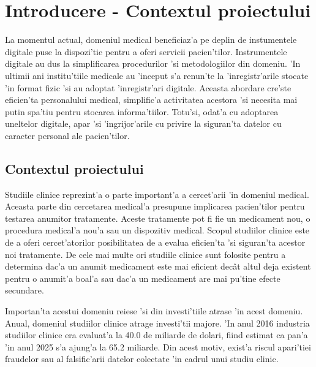 \documentclass[12pt,a4paper,twoside]{report}
\begin{document}
\newpage




% 

\newpage

\tableofcontents
\newpage
\listoffigures
\listoftables

\renewcommand*{\glossaryname}{Glosar}
\glsaddall
\printnoidxglossaries



\chapter{Introducere - Contextul proiectului}
\pagestyle{headings}
    La momentul actual, domeniul medical beneficiaz'a pe deplin de instumentele digitale puse la dispozi'tie pentru a oferi servicii pacien'tilor. Instrumentele digitale au dus la simplificarea procedurilor 'si metodologiilor din domeniu. 'In ultimii ani institu'tiile medicale au 'inceput s'a renun'te la 'inregistr'arile stocate 'in format fizic 'si au adoptat 'inregistr'ari digitale. Aceasta abordare cre'ste eficien'ta personalului medical, simplific'a activitatea acestora 'si necesita mai putin spa'tiu pentru stocarea informa'tiilor. Totu'si, odat'a cu adoptarea uneltelor digitale, apar 'si 'ingrijor'arile cu privire la siguran'ta datelor cu caracter personal ale pacien'tilor.
    

\section{Contextul proiectului}
    Studiile clinice reprezint'a o parte important'a a cercet'arii 'in domeniul medical. Aceasta parte din cercetarea medical'a presupune implicarea pacien'tilor pentru testarea anumitor tratamente. Aceste tratamente pot fi fie un medicament nou, o procedura medical'a nou'a sau un dispozitiv medical. Scopul studiilor clinice este de a oferi cercet'atorilor posibilitatea de a evalua eficien'ta 'si siguran'ta acestor noi tratamente. De cele mai multe ori studiile clinice sunt folosite pentru a determina dac'a un anumit medicament este mai eficient dec\^at altul deja existent pentru o anumit'a boal'a sau dac'a un medicament are mai pu'tine efecte secundare.
    
    Importan'ta acestui domeniu reiese 'si din investi'tiile atrase 'in acest domeniu. Anual, domeniul studiilor clinice atrage investi'tii majore. 'In anul 2016 industria studiilor clinice era evaluat'a la 40.0 de miliarde de dolari, fiind estimat ca pan'a 'in anul 2025 s'a ajung'a la 65.2 miliarde. Din acest motiv, exist'a riscul apari'tiei fraudelor sau al falsific'arii datelor colectate 'in cadrul unui studiu clinic.
    
\end{document}

